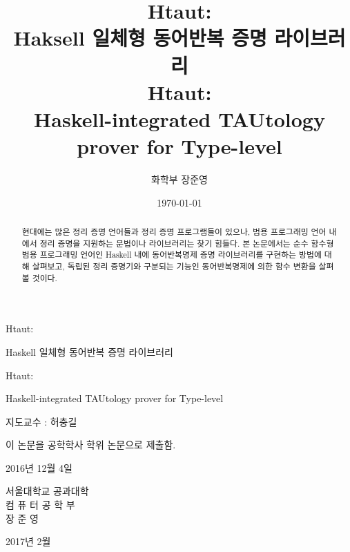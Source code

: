 \documentclass[a4paper, 12pt]{oblivoir}
\begin{document}
\begin{titlingpage}
  \begin{center}
    \vspace*{2\baselineskip}
    \fontsize{24}{24}\selectfont
    Htaut:

    Haskell 일체형 동어반복 증명 라이브러리

    \fontsize{20}{20}\selectfont
    Htaut:
    
    Haskell-integrated TAUtology prover for Type-level

    \vspace*{2\baselineskip}
    \fontsize{18}{18}\selectfont
    지도교수 : 허충길

    \vspace*{\baselineskip}
    이 논문을 공학학사 학위 논문으로 제출함.

    \vspace*{2\baselineskip}
    2016년 12월 4일

    \vspace*{3\baselineskip}
    서울대학교 공과대학\\
    컴 퓨 터 공 학 부\\
    장 준 영

    \vspace*{\baselineskip}
    2017년 2월
  \end{center}
\end{titlingpage}
\restoregeometry{}

\title{Htaut:\\
  Haksell 일체형 동어반복 증명 라이브러리\\
  \Large
  Htaut:\\
  Haskell-integrated TAUtology prover for Type-level}
\author{화학부 장준영}
\date{\today}

\maketitle{}

\begin{abstract}
  현대에는 많은 정리 증명 언어들과 정리 증명 프로그램들이 있으나,
  범용 프로그래밍 언어 내에서 정리 증명을 지원하는 문법이나 라이브러리는 찾기 힘들다.
  본 논문에서는 순수 함수형 범용 프로그래밍 언어인 Haskell 내에 동어반복명제 증명 라이브러리를 구현하는 방법에 대해 살펴보고,
  독립된 정리 증명기와 구분되는 기능인 동어반복명제에 의한 함수 변환을 살펴볼 것이다.

\end{abstract}
\end{document}
